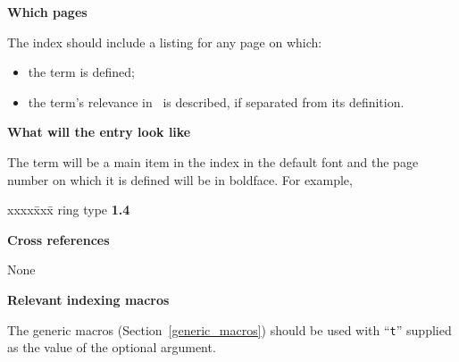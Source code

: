 \documentclass{article}
\newenvironment{indexex}{\begin{tabbing}
xxxx\=xxx\=\kill}{\end{tabbing}}
\begin{document}
\begin{description}
   \item{\bf Which pages}

         The index should include a listing for any page on which:
           \begin{itemize}
                \item the term is defined;
                \item the term's relevance in \cgal\ is described,
                      if separated from its definition.
           \end{itemize}
   \item{\bf What will the entry look like}

        The term will be a main item in the index in the default font 
        and the page number on which it is defined will be in boldface.
        For example,
        \begin{indexex}
        ring type               {\bf   1.4}
        \end{indexex}
   \item{\bf Cross references} 

         None 

   \item {\bf Relevant indexing macros}

         The generic macros (Section~\ref{generic_macros}) should be used 
         with ``{\tt t}'' supplied as the value of the optional argument.

\end{description}
\end{document}
